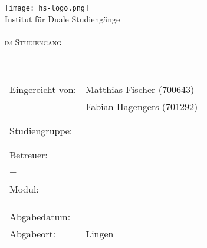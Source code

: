 
\begin{titlepage}

	\begin{center}
		\texttt{[image: hs-logo.png]}\\
		\large{Institut für Duale Studiengänge}\\[4ex]
		
		\large{\scshape \betreff}\\
		\large{\scshape im Studiengang \studiengang}\\[10ex]
		
		
		\huge{\textbf{\titel}}\\[1.5ex]
		\Large{\textbf{\untertitel}}\\[10ex]
	\end{center}
	
	\begin{tabular} { p{7.5cm} l }
		Eingereicht von: & Matthias Fischer (700643) \\
		& Fabian Hagengers (701292) \\
		\\
		\\
		Studiengruppe: & \autorStudiengruppe \\
		\\\\
		Betreuer: & \betreuer \\
		\if\zweitBetreuer={}\else & \zweitBetreuer \\ \fi
		Modul: & \modul \\
		\\\\\\
		Abgabedatum: & \abgabeTermin \\
		Abgabeort: & Lingen \\
	\end{tabular}


\end{titlepage}